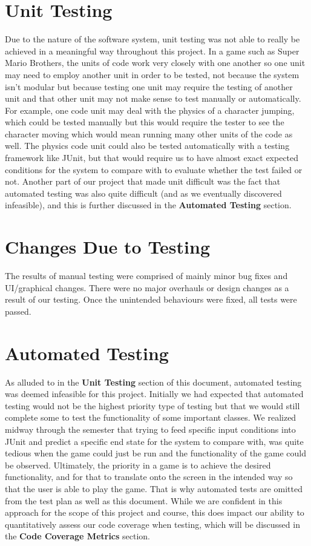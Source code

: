 \documentclass[12pt, titlepage]{article}
\begin{document}
\section{Unit Testing}

    Due to the nature of the software system, unit testing was not able to really be achieved in a meaningful way throughout this project. In a game such as Super Mario Brothers, the units of code work very closely with one another so one unit may need to employ another unit in order to be tested, not because the system isn't modular but because testing one unit may require the testing of another unit and that other unit may not make sense to test manually or automatically. For example, one code unit may deal with the physics of a character jumping, which could be tested manually but this would require the tester to see the character moving which would mean running many other units of the code as well. The physics code unit could also be tested automatically with a testing framework like JUnit, but that would require us to have almost exact expected conditions for the system to compare with to evaluate whether the test failed or not. Another part of our project that made unit difficult was the fact that automated testing was also quite difficult (and as we eventually discovered infeasible), and this is further discussed in the \textbf{Automated Testing} section.

\section{Changes Due to Testing}

The results of manual testing were comprised of mainly minor bug fixes and UI/graphical changes. There were no major overhauls or design changes as a result of our testing. Once the unintended behaviours were fixed, all tests were passed.

\section{Automated Testing}

As alluded to in the \textbf{Unit Testing} section of this document, automated testing was deemed infeasible for this project. Initially we had expected that automated testing would not be the highest priority type of testing but that we would still complete some to test the functionality of some important classes. We realized midway through the semester that trying to feed specific input conditions into JUnit and predict a specific end state for the system to compare with, was quite tedious when the game could just be run and the functionality of the game could be observed. Ultimately, the priority in a game is to achieve the desired functionality, and for that to translate onto the screen in the intended way so that the user is able to play the game. That is why automated tests are omitted from the test plan as well as this document. While we are confident in this approach for the scope of this project and course, this does impact our ability to quantitatively assess our code coverage when testing, which will be discussed in the \textbf{Code Coverage Metrics} section.
\end{document}
